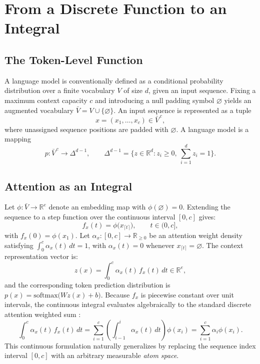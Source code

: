 \documentclass[preprint,12pt]{elsarticle}
\newcommand{\R}{\mathbb{R}}
\newcommand{\V}{V}
\newcommand{\VBar}{\bar{V}}
\begin{document}
\section{From a Discrete Function to an Integral}
\label{sec:discrete_to_integral}

\subsection{The Token-Level Function}

A language model is conventionally defined as a conditional probability distribution over a finite vocabulary $\V$ of size $d$, given an input sequence. Fixing a maximum context capacity $c$ and introducing a null padding symbol $\varnothing$ yields an augmented vocabulary $\VBar = \V \cup \{\varnothing\}$. An input sequence is represented as a tuple
\[
  x = (x_1, \dots, x_c) \in \VBar^{\,c},
\]
where unassigned sequence positions are padded with $\varnothing$. A language model is a mapping
\[
  p : \VBar^{\,c} \to \Delta^{d-1}, \qquad
  \Delta^{d-1} = \Big\{ z \in \R^d : z_i \ge 0,\ \sum_{i=1}^d z_i = 1 \Big\}.
\]

\subsection{Attention as an Integral}

Let $\phi : \VBar \to \R^{e}$ denote an embedding map with $\phi(\varnothing) = 0$. Extending the sequence to a step function over the continuous interval $[0,c]$ gives:
\[
  f_x(t) = \phi\big(x_{\lceil t \rceil}\big), \qquad t \in (0,c],
\]
with $f_x(0) = \phi(x_1)$. Let $\alpha_x : [0,c] \to \R_{\ge 0}$ be an attention weight density satisfying $\int_0^c \alpha_x(t)\,dt = 1$, with $\alpha_x(t) = 0$ whenever $x_{\lceil t \rceil} = \varnothing$. The context representation vector is:
\[
  z(x) = \int_0^c \alpha_x(t)\, f_x(t)\, dt \in \R^e,
\]
and the corresponding token prediction distribution is $p(x) = \mathrm{softmax}\big( W z(x) + b \big)$.
Because $f_x$ is piecewise constant over unit intervals, the continuous integral evaluates algebraically to the standard discrete attention weighted sum \cite{vaswani2017attention, martins2020sparse}:
\[
  \int_0^c \alpha_x(t)\, f_x(t)\, dt = \sum_{i=1}^c \left( \int_{i-1}^i \alpha_x(t)\, dt \right) \phi(x_i) = \sum_{i=1}^c \alpha_i \phi(x_i).
\]
This continuous formulation naturally generalizes by replacing the sequence index interval $[0,c]$ with an arbitrary measurable \emph{atom space}.
\end{document}
